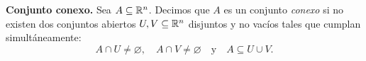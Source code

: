 \begin{definition} \textbf{Conjunto conexo.} \label{def:conexo}
    Sea $A \subseteq \mathbb{R}^n$. Decimos que $A$ es un conjunto \emph{conexo} si no existen dos conjuntos abiertos $U, V \subseteq \mathbb{R}^n$ disjuntos y no vacíos tales que cumplan simultáneamente:
    \[
     A \cap U \neq \varnothing, \quad A \cap V \neq \varnothing \quad \text{y} \quad A \subseteq U \cup V.
    \]
\end{definition}








